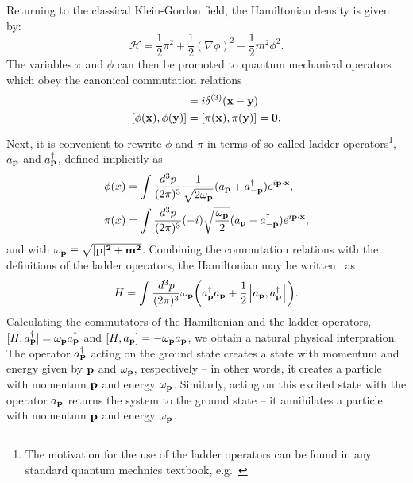 Returning to the classical Klein-Gordon field, the Hamiltonian density is given by:
\begin{equation} \label{eqn:classical_kg_ham}
    \mathcal H = \frac{1}{2} \pi^2 + \frac{1}{2} (\nabla \phi)^2 + \frac{1}{2} m^2 \phi^2.
\end{equation}
The variables $\pi$ and $\phi$ can then be promoted to quantum mechanical operators which obey the canonical commutation relations
\begin{align}
    [\phi(\bf{x}), \pi(\bf{y})] &= i \delta^{(3)}(\bf{x} - \bf{y}) \\
    [\phi(\bf{x}), \phi(\bf{y})] &= [\pi(\bf{x}), \pi(\bf{y})] = 0.
\end{align}
Next, it is convenient to rewrite $\phi$ and $\pi$ in terms of so-called ladder operators\footnote{The motivation for the use of the ladder operators can be found in any standard quantum mechnics textbook, e.g.~\cite{Griffiths:qm}},  $a_{\bf{p}}$ and $a^{\dagger}_{\bf{p}}$, defined implicitly as
\begin{align}
    \phi(x) &= \int \frac{d^3p}{(2\pi)^3} \frac{1}{\sqrt{2\omega_{\bf{p}}}} (a_{\bf{p}} + a^{\dagger}_{-\bf{p}}) e^{i \bf{p}\cdot\bf{x}}, \\
    \pi(x) &= \int \frac{d^3p}{(2\pi)^3} (-i) \sqrt{\frac{\omega_{\bf{p}}}{2}} (a_{\bf{p}} - a^{\dagger}_{-\bf{p}}) e^{i \bf{p}\cdot\bf{x}},
\end{align}
and with $\omega_{\bf{p}} \equiv \sqrt{|\bf{p}|^2 + m^2}$.
Combining the commutation relations with the definitions of the ladder operators, the Hamiltonian may be written~\cite{Peskin:1995ev} as
\begin{equation}
    H = \int \frac{d^3p}{(2\pi)^3} \omega_{\bf{p}} \bigg( a^{\dagger}_{\bf{p}} a_{\bf{p}} + \frac{1}{2} \Big[a_{\bf{p}}, a^{\dagger}_{\bf{p}} \Big] \bigg).
\end{equation}
Calculating the commutators of the Hamiltonian and the ladder operators, $[H, a^{\dagger}_{\bf{p}}] = \omega_{\bf{p}} a^{\dagger}_{\bf{p}}$ and $[H, a_{\bf{p}}] = -\omega_{\bf{p}} a_{\bf{p}}$, we obtain a natural physical interpration.
The operator $a^{\dagger}_{\bf{p}}$ acting on the ground state creates a state with momentum and energy given by $\bf{p}$ and $\omega_{\bf{p}}$, respectively -- in other words, it creates a particle with momentum $\bf{p}$ and energy $\omega_{\bf{p}}$.
Similarly, acting on this excited state with the operator $a_{\bf{p}}$ returns the system to the ground state -- it annihilates a particle with momentum $\bf{p}$ and energy $\omega_{\bf{p}}$.

